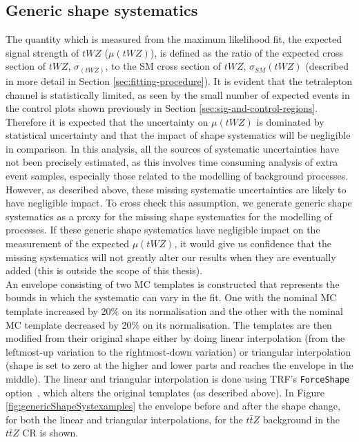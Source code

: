 \subsection{Generic shape systematics}
\label{sec:genericShapeSyst}

The quantity which is measured from the maximum likelihood fit, the expected signal strength of $tWZ$ ($\mu (tWZ)$), is defined as the ratio of the expected cross section of $tWZ$, $\sigma_(tWZ)$, to the SM cross section of $tWZ$, $\sigma_{SM}(tWZ)$ (described in more detail in Section \ref{sec:fitting-procedure}). It is evident that the tetralepton channel is statistically limited, as seen by the small number of expected events in the control plots shown previously in Section \ref{sec:sig-and-control-regions}. Therefore it is expected that the uncertainty on $\mu(tWZ)$ is dominated by statistical uncertainty and that the impact of shape systematics will be negligible in comparison. In this analysis, all the sources of systematic uncertainties have not been precisely estimated, as this involves time consuming analysis of extra event samples, especially those related to the modelling of background processes. However, as described above, these missing systematic uncertainties are likely to have negligible impact. To cross check this assumption, we generate generic shape systematics as a proxy for the missing shape systematics for the modelling of processes. If these generic shape systematics have negligible impact on the measurement of the expected $\mu (tWZ)$, it would give us confidence that the missing systematics will not greatly alter our results when they are eventually added (this is outside the scope of this thesis).\\

An envelope consisting of two MC templates is constructed that represents the bounds in which the systematic can vary in the fit. One with the nominal MC template increased by 20$\%$ on its normalisation and the other with the nominal MC template decreased by 20$\%$ on its normalisation. The templates are then modified from their original shape either by doing linear interpolation (from the leftmost-up variation to the rightmost-down variation) or triangular interpolation (shape is set to zero at the higher and lower parts and reaches the envelope in the middle). The linear and triangular interpolation is done using TRF's \texttt{ForceShape} option~\cite{TRF-ForceShape}, which alters the original templates (as described above). In Figure \ref{fig:genericShapeSystexamples} the envelope before and after the shape change, for both the linear and triangular interpolations, for the $t\bar{t}Z$ background in the $t\bar{t}Z$ CR is shown.

